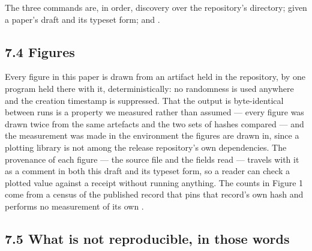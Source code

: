\documentclass[11pt]{article}
\begin{document}
The three commands are, in order,  discovery over the repository's  directory;  given a paper's draft and its typeset form; and %
.

\subsection*{7.4 Figures}

Every figure in this paper is drawn from an artifact held in the repository, by one program held there with it, deterministically: no randomness is used anywhere and the creation timestamp is suppressed. That the output is byte-identical between runs is a property we measured rather than assumed --- every figure was drawn twice from the same artefacts and the two sets of hashes compared --- and the measurement was made in the environment the figures are drawn in, since a plotting library is not among the release repository's own dependencies. The provenance of each figure --- the source file and the fields read --- travels with it as a comment in both this draft and its typeset form, so a reader can check a plotted value against a receipt without running anything. The counts in Figure 1 come from a census of the published record that pins that record's own hash and performs no measurement of its own%
.

\subsection*{7.5 What is not reproducible, in those words}
\end{document}
